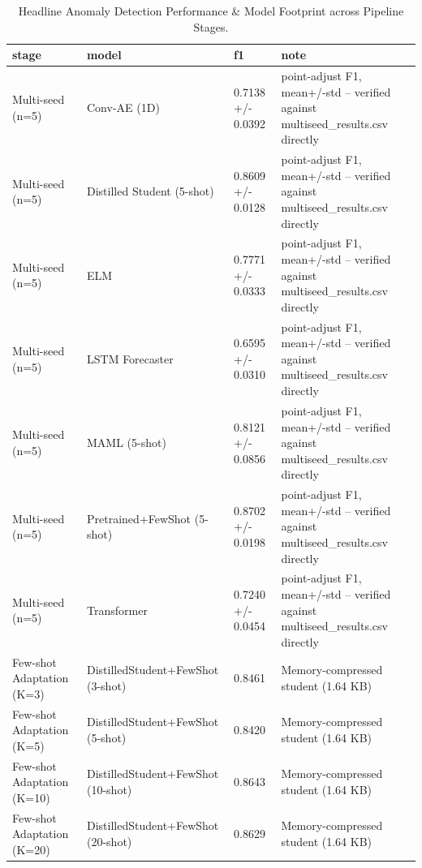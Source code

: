 \begin{table}
\caption{Headline Anomaly Detection Performance & Model Footprint across Pipeline Stages.}
\label{tab:headline_results}
\begin{tabular}{llll}
\toprule
stage & model & f1 & note \\
\midrule
Multi-seed (n=5) & Conv-AE (1D) & 0.7138 +/- 0.0392 & point-adjust F1, mean+/-std -- verified against multiseed_results.csv directly \\
Multi-seed (n=5) & Distilled Student (5-shot) & 0.8609 +/- 0.0128 & point-adjust F1, mean+/-std -- verified against multiseed_results.csv directly \\
Multi-seed (n=5) & ELM & 0.7771 +/- 0.0333 & point-adjust F1, mean+/-std -- verified against multiseed_results.csv directly \\
Multi-seed (n=5) & LSTM Forecaster & 0.6595 +/- 0.0310 & point-adjust F1, mean+/-std -- verified against multiseed_results.csv directly \\
Multi-seed (n=5) & MAML (5-shot) & 0.8121 +/- 0.0856 & point-adjust F1, mean+/-std -- verified against multiseed_results.csv directly \\
Multi-seed (n=5) & Pretrained+FewShot (5-shot) & 0.8702 +/- 0.0198 & point-adjust F1, mean+/-std -- verified against multiseed_results.csv directly \\
Multi-seed (n=5) & Transformer & 0.7240 +/- 0.0454 & point-adjust F1, mean+/-std -- verified against multiseed_results.csv directly \\
Few-shot Adaptation (K=3) & DistilledStudent+FewShot (3-shot) & 0.8461 & Memory-compressed student (1.64 KB) \\
Few-shot Adaptation (K=5) & DistilledStudent+FewShot (5-shot) & 0.8420 & Memory-compressed student (1.64 KB) \\
Few-shot Adaptation (K=10) & DistilledStudent+FewShot (10-shot) & 0.8643 & Memory-compressed student (1.64 KB) \\
Few-shot Adaptation (K=20) & DistilledStudent+FewShot (20-shot) & 0.8629 & Memory-compressed student (1.64 KB) \\
\bottomrule
\end{tabular}
\end{table}
